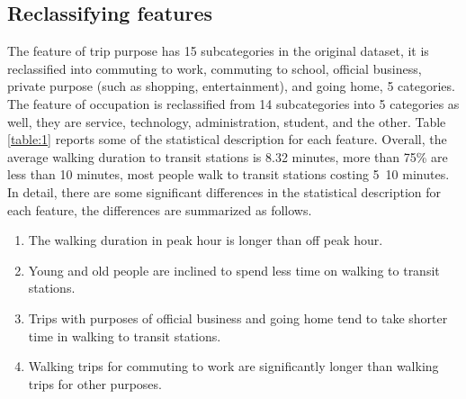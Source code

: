 \documentclass[Journal,letterpaper]{ascelike-new}
\begin{document}
\subsection{Reclassifying features}
The feature of trip purpose has 15 subcategories in the original dataset, it is reclassified into commuting to work, commuting to school, official business, private purpose (such as shopping, entertainment), and going home, 5 categories. The feature of occupation is reclassified from 14 subcategories into 5 categories as well, they are service, technology, administration, student, and the other. Table \ref{table:1} reports some of the statistical description for each feature. Overall, the average walking duration to transit stations is 8.32 minutes, more than 75\% are less than 10 minutes, most people walk to transit stations costing 5~10 minutes. In detail, there are some significant differences in the statistical description for each feature, the differences are summarized as follows.
%
\begin{enumerate}
    \item The walking duration in peak hour is longer than off peak hour.
    \item Young and old people are inclined to spend less time on walking to transit stations.
    \item Trips with purposes of official business and going home tend to take shorter time in walking to transit stations.
    \item Walking trips for commuting to work are significantly longer than walking trips for other purposes.
\end{enumerate}
%
\end{document}
